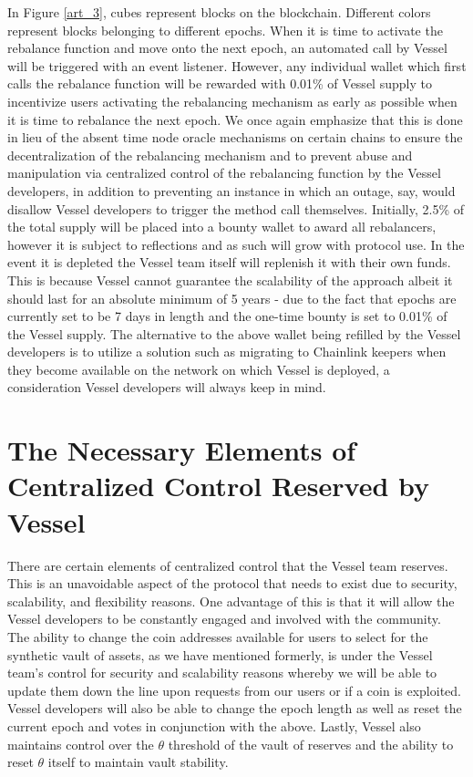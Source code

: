 \documentclass[letterpaper,11pt]{article}
\begin{document}
In Figure \ref{art_3}, cubes represent blocks on the blockchain. Different colors represent blocks belonging to different epochs. When it is time to activate the rebalance function and move onto the next epoch, an automated call by Vessel will be triggered with an event listener. However, any individual wallet which first calls the rebalance function will be rewarded with 0.01\% of Vessel supply to incentivize users activating the rebalancing mechanism as early as possible when it is time to rebalance the next epoch. We once again emphasize that this is done in lieu of the absent time node oracle mechanisms on certain chains to ensure the decentralization of the rebalancing mechanism and to prevent abuse and manipulation via centralized control of the rebalancing function by the Vessel developers, in addition to preventing an instance in which an outage, say, would disallow Vessel developers to trigger the method call themselves. Initially, 2.5\% of the total supply will be placed into a bounty wallet to award all rebalancers, however it is subject to reflections and as such will grow with protocol use. In the event it is depleted the Vessel team itself will replenish it with their own funds. This is because Vessel cannot guarantee the scalability of the approach albeit it should last for an absolute minimum of 5 years - due to the fact that epochs are currently set to be 7 days in length and the one-time bounty is set to 0.01\% of the Vessel supply. The alternative to the above wallet being refilled by the Vessel developers is to utilize a solution such as migrating to Chainlink keepers when they become available on the network on which Vessel is deployed, a consideration Vessel developers will always keep in mind. 


\section{The Necessary Elements of Centralized Control 
Reserved by Vessel}

There are certain elements of centralized control that the Vessel team reserves. This is an unavoidable aspect of the protocol that needs to exist due to security, scalability, and flexibility reasons. One advantage of this is that it will allow the Vessel developers to be constantly engaged and involved with the community. The ability to change the coin addresses available for users to select for the synthetic vault of assets, as we have mentioned formerly, is under the Vessel team’s control for security and scalability reasons whereby we will be able to update them down the line upon requests from our users or if a coin is exploited. Vessel developers will also be able to change the epoch length as well as reset the current epoch and votes in conjunction with the above. Lastly, Vessel also maintains control over the $\theta$ threshold of the vault of reserves and the ability to reset $\theta$ itself to maintain vault stability.  
\end{document}
